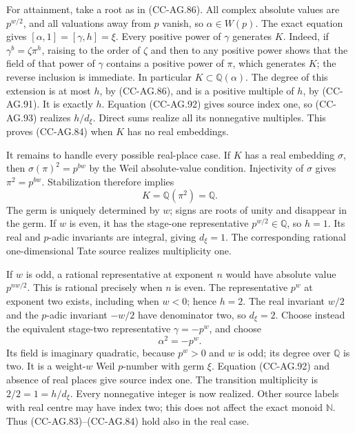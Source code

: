 For attainment, take a root as in (CC-AG.86).
All complex absolute values are \(p^{w/2}\), and all
valuations away from \(p\) vanish, so \(\alpha\in W(p)\).
The exact equation gives
\([\alpha,1]=[\gamma,h]=\xi\).
Every positive power of \(\gamma\) generates \(K\).
Indeed, if \(\gamma^b=\zeta\pi^h\), raising to the
order of \(\zeta\) and then to any positive power
shows that the field of that power of \(\gamma\)
contains a positive power of \(\pi\), which generates
\(K\); the reverse inclusion is immediate.
In particular \(K\subset\mathbb Q(\alpha)\).
The degree of this extension is at most \(h\), by
(CC-AG.86), and is a positive multiple of \(h\), by
(CC-AG.91).  It is exactly \(h\).
Equation (CC-AG.92) gives source index one, so
(CC-AG.93) realizes \(h/d_\xi\).
Direct sums realize all its nonnegative multiples.
This proves (CC-AG.84) when \(K\) has no real embeddings.

It remains to handle every possible real-place case.
If \(K\) has a real embedding \(\sigma\), then
\(\sigma(\pi)^2=p^{bw}\) by the Weil absolute-value
condition.  Injectivity of \(\sigma\) gives
\(\pi^2=p^{bw}\).  Stabilization therefore implies
\[
                             K=\mathbb Q(\pi^2)=\mathbb Q.
                                                        \tag{CC-AG.94}
\]
The germ is uniquely determined by \(w\); signs are
roots of unity and disappear in the germ.
If \(w\) is even, it has the stage-one representative
\(p^{w/2}\in\mathbb Q\), so \(h=1\).  Its real and
\(p\)-adic invariants are integral, giving \(d_\xi=1\).
The corresponding rational one-dimensional Tate
source realizes multiplicity one.

If \(w\) is odd, a rational representative at exponent
\(n\) would have absolute value \(p^{nw/2}\).
This is rational precisely when \(n\) is even.
The representative \(p^w\) at exponent two exists,
including when \(w<0\); hence \(h=2\).
The real invariant \(w/2\) and the \(p\)-adic invariant
\(-w/2\) have denominator two, so \(d_\xi=2\).
Choose instead the equivalent stage-two representative
\(\gamma=-p^w\), and choose
\[
                                  \alpha^2=-p^w.
                                                        \tag{CC-AG.95}
\]
Its field is imaginary quadratic, because \(p^w>0\)
and \(w\) is odd; its degree over \(\mathbb Q\) is two.
It is a weight-\(w\) Weil \(p\)-number with germ \(\xi\).
Equation (CC-AG.92) and absence of real places give
source index one.  The transition multiplicity is
\(2/2=1=h/d_\xi\).
Every nonnegative integer is now realized.  Other
source labels with real centre may have index two;
this does not affect the exact monoid \(\mathbb N\).
Thus (CC-AG.83)--(CC-AG.84) hold also in the real case.

